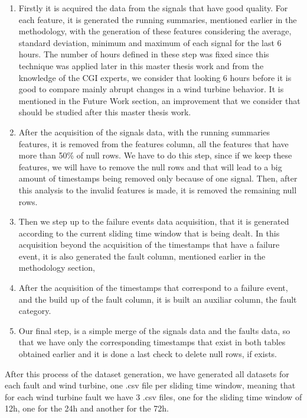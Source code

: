 \begin{enumerate}
    \item 
Firstly it is acquired the data from the signals that have good quality. For each feature, it is generated the running summaries, mentioned earlier in the methodology, with the generation of these features considering the average, standard deviation, minimum and maximum of each signal for the last 6 hours.
The number of hours defined in these step was fixed since this technique was applied later in this master thesis work and from the knowledge of the CGI experts, we consider that looking 6 hours before it is good to compare mainly abrupt changes in a wind turbine behavior.
It is mentioned in the Future Work section, an improvement that we consider that should be studied after this master thesis work.

    \item
After the acquisition of the signals data, with the running summaries features, it is removed from the features column, all the features that have more than 50\% of null rows. We have to do this step, since if we keep these features, we will have to remove the null rows and that will lead to a big amount of timestamps being removed only because of one signal.
Then, after this analysis to the invalid features is made, it is removed the remaining null rows.

    \item
Then we step up to the failure events data acquisition, that it is generated according to the current sliding time window that is being dealt. In this acquisition beyond the acquisition of the timestamps that have a failure event, it is also generated the fault column, mentioned earlier in the methodology section,

    \item
After the acquisition of the timestamps that correspond to a failure event, and the build up of the fault column, it is built an auxiliar column, the fault category.

    \item
Our final step, is a simple merge of the signals data and the faults data, so that we have only the corresponding timestamps that exist in both tables obtained earlier and it is done a last check to delete null rows, if exists.

\end{enumerate}

After this process of the dataset generation, we have generated all datasets for each fault and wind turbine, one .csv file per sliding time window, meaning that for each wind turbine fault we have 3 .csv files, one for the sliding time window of 12h, one for the 24h and another for the 72h.

